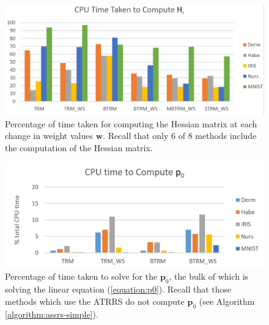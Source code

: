 \documentclass[letterpaper,12pt,titlepage,oneside,final]{book}
\begin{document}
	\begin{figure}
		\centering
		\includegraphics[width=\textwidth]{images/CPU_time_H}
		\caption{Percentage of time taken for computing the Hessian matrix at each change in weight values $\mathbf{w}$. Recall that only 6 of 8 methods include the computation of the Hessian matrix. }
		\label{figure:H_time}
	\end{figure}
\begin{figure}
	\centering
	\includegraphics[width=\textwidth]{images/CPU_time_p0}
	\caption{Percentage of time taken to solve for the $\mathbf{p}_{0}$, the bulk of which is solving the linear equation (\ref{equation:p0}). Recall that those methods which use the ATRRS do not compute $\mathbf{p}_{0}$ (see Algorithm \ref{algorithm:assrs-simple}).}
	\label{figure:p0_time}
\end{figure}
	
\end{document}
